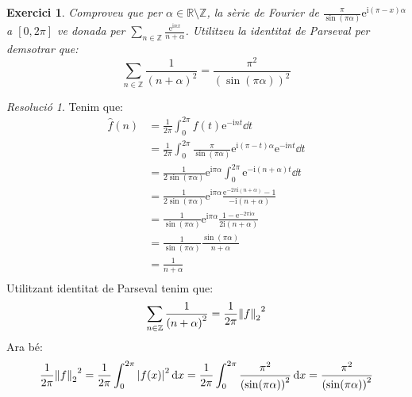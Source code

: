\documentclass[10pt,a4paper]{article}
\newcommand{\ZZ}{\ensuremath{\mathbb{Z}}} %
\newcommand{\RR}{\ensuremath{\mathbb{R}}} %
\newcommand{\ii}{\mathrm{i}} %
\newtheorem{exercici}{Exercici}
\theoremstyle{definition}
\theoremstyle{remark}
\newtheorem*{res}{Resolució}
\renewcommand{\exp}[1]{\mathrm{e}^{#1}} %
\begin{document}
\begin{exercici}
  Comproveu que per $\alpha\in\RR\setminus\ZZ$, la sèrie de Fourier de $\displaystyle\frac{\pi}{\sin(\pi\alpha)}\exp{\ii(\pi-x)\alpha}$ a $[0,2\pi]$ ve donada per $\sum_{n\in\ZZ}\frac{\exp{\ii nx}}{n+\alpha}$. Utilitzeu la identitat de Parseval per demsotrar que:
  $$\sum_{n\in\ZZ}\frac{1}{{(n+\alpha)}^2}=\frac{\pi^2}{{(\sin(\pi\alpha))}^2}$$
\end{exercici}
\begin{res}
  Tenim que:
  \begin{align*}
    \widehat{f}(n) & =\frac{1}{2\pi}\int_{0}^{2\pi}f(t)\exp{-\ii n t}\dd{t}                                               \\
                   & =\frac{1}{2\pi}\int_{0}^{2\pi}\frac{\pi}{\sin(\pi\alpha)}\exp{\ii (\pi-t)\alpha}\exp{-\ii n t}\dd{t} \\
                   & =\frac{1}{2\sin(\pi\alpha)}\exp{\ii\pi\alpha}\int_{0}^{2\pi}\exp{-\ii (n+\alpha) t}\dd{t}            \\
                   & =\frac{1}{2\sin(\pi\alpha)}\exp{\ii\pi\alpha}\frac{\exp{-2\pi\ii(n+\alpha)}-1}{-\ii(n+\alpha)}       \\
                   & =\frac{1}{\sin(\pi\alpha)}\exp{\ii\pi\alpha}\frac{1-\exp{-2\pi\ii\alpha}}{2\ii(n+\alpha)}            \\
                   & =\frac{1}{\sin(\pi\alpha)}\frac{\sin(\pi\alpha)}{n+\alpha}                                           \\
                   & =\frac{1}{n+\alpha}                                                                                  \\
  \end{align*}
  Utilitzant identitat de Parseval tenim que:
  $$\sum_{n\in\ZZ}\frac{1}{{(n+\alpha)}^2}=\frac{1}{2\pi}{\norm{f}_2}^2$$
  Ara bé: $$\frac{1}{2\pi}{\norm{f}_2}^2=\frac{1}{2\pi}\int_0^{2\pi}\abs{f(x)}^2\dd{x}=\frac{1}{2\pi}\int_0^{2\pi}\frac{\pi^2}{{(\sin(\pi\alpha))}^2}\dd{x}=\frac{\pi^2}{{(\sin(\pi\alpha))}^2}$$
\end{res}
\end{document}
